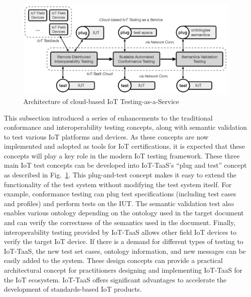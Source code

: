 \begin{figure}[H]			%
	\centering
	\includegraphics[width=\textwidth]{figures/fig_iot-taas_architecture.pdf}
    \caption{Architecture of cloud-based IoT Testing-as-a-Service}
    \label{fig:iot-taas_architecture}
\end{figure}

This subsection introduced a series of enhancements to the traditional conformance and interoperability testing concepts, along with semantic validation to test various IoT platforms and devices. As these concepts are now implemented and adopted as tools for IoT certifications, it is expected that these concepts will play a key role in the modern IoT testing framework. These three main IoT test concepts can be developed into IoT-TaaS's ``plug and test'' concept as described in Fig.~\ref{fig:iot-taas_architecture}. This plug-and-test concept makes it easy to extend the functionality of the test system without modifying the test system itself. For example, conformance testing can plug test specifications (including test cases and profiles) and perform tests on the IUT. The semantic validation test also enables various ontology depending on the ontology used in the target document and can verify the correctness of the semantics used in the document. Finally, interoperability testing provided by IoT-TaaS allows other field IoT devices to verify the target IoT device. If there is a demand for different types of testing to IoT-TaaS, the new test set cases, ontology information, and new messages can be easily added to the system. These design concepts can provide a practical architectural concept for practitioners designing and implementing IoT-TaaS for the IoT ecosystem. IoT-TaaS offers significant advantages to accelerate the development of standards-based IoT products.

